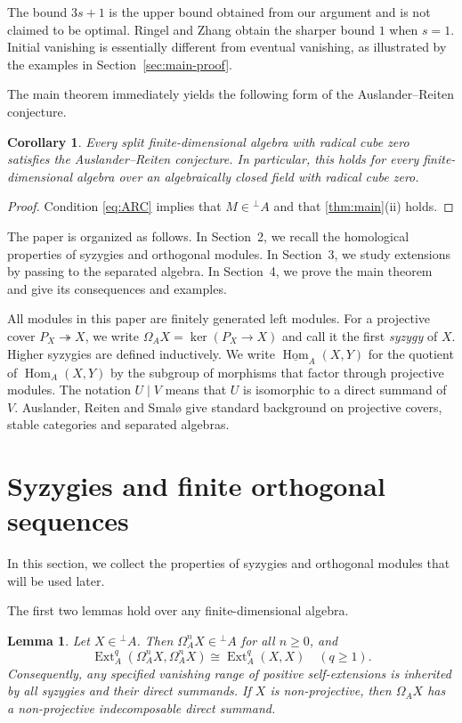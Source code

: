 \documentclass[a4paper,reqno]{amsart}
\numberwithin{equation}{section}
\newtheorem{lemma}[lemma]{Lemma}
\newtheorem{corollary}[corollary]{Corollary}
\newcommand{\Ext}{\operatorname{Ext}}
\newcommand{\Hom}{\operatorname{Hom}}
\newcommand{\perpA}{{}^{\perp}\!A}
\newcommand{\stableHom}{\underline{\Hom}}
\begin{document}
The bound $3s+1$ is the upper bound obtained from our argument and
is not claimed to be optimal. Ringel and Zhang \cite{RZ22} obtain the
sharper bound $1$ when $s=1$. Initial vanishing is essentially different
from eventual vanishing, as illustrated by the examples in
Section~\ref{sec:main-proof}.

The main theorem immediately yields the following form of the Auslander--Reiten conjecture.

\begin{corollary}\label{cor:ARC}
Every split finite-dimensional algebra with radical cube zero
satisfies the Auslander--Reiten conjecture. In particular, this holds
for every finite-dimensional algebra over an algebraically closed
field with radical cube zero.
\end{corollary}

\begin{proof}
Condition \eqref{eq:ARC} implies that $M\in\perpA$ and that
\cref{thm:main}\textnormal{(ii)} holds.
\end{proof}

The paper is organized as follows. In Section~2, we recall the
homological properties of syzygies and orthogonal modules. In Section~3,
we study extensions by passing to the separated algebra. In Section~4,
we prove the main theorem and give its consequences and examples.

All modules in this paper are finitely generated left modules. For
a projective cover $P_X\twoheadrightarrow X$, we write
$\Omega_A X=\ker(P_X\to X)$ and call it the first \emph{syzygy} of
$X$. Higher syzygies are defined inductively. We write
$\stableHom_A(X,Y)$ for the quotient of $\Hom_A(X,Y)$ by the subgroup
of morphisms that factor through projective modules. The notation
$U\mid V$ means that $U$ is isomorphic to a direct summand of $V$.
Auslander, Reiten and Smal\o{} \cite{ARS} give standard background on
projective covers, stable categories and separated algebras.


\section{Syzygies and finite orthogonal sequences}

In this section, we collect the properties of syzygies and orthogonal modules that will be used later.

The first two lemmas hold over any finite-dimensional algebra.

\begin{lemma}\label{lem:syzygy}
Let $X\in\perpA$. Then $\Omega_A^nX\in\perpA$ for all $n\ge0$, and
\[
 \Ext_A^q(\Omega_A^nX,\Omega_A^nX)
 \cong \Ext_A^q(X,X)\quad(q\ge1).
\]
Consequently, any specified vanishing range of positive
self-extensions is inherited by all syzygies and their direct
summands. If $X$ is non-projective, then $\Omega_A X$ has a
non-projective indecomposable direct summand.
\end{lemma}
\end{document}
